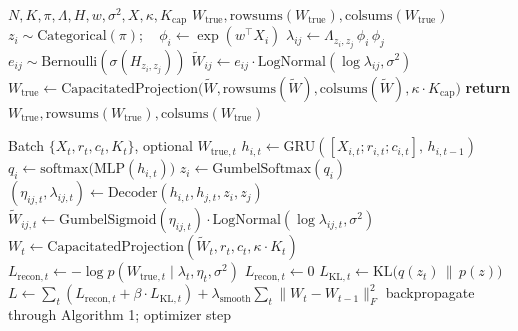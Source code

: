 \documentclass[
  a4paper,
]{article}
\begin{document}
\begin{algorithm}[htbp]
\caption{Sample Synthetic Network}
  \begin{algorithmic}[1]
  \Require $N, K, \pi, \Lambda, H, w, \sigma^2, X, \kappa, K_{\text{cap}}$
  \Ensure $W_{\text{true}}, \text{rowsums}(W_{\text{true}}), \text{colsums}(W_{\text{true}})$
      \State $z_i \sim \text{Categorical}(\pi); \quad \phi_i \leftarrow \exp(w^\top X_i)$
  \EndFor
      \State $\lambda_{ij} \leftarrow \Lambda_{z_i, z_j} \, \phi_i \, \phi_j$
      \State $e_{ij} \sim \text{Bernoulli}(\sigma(H_{z_i, z_j}))$
      \State $\tilde{W}_{ij} \leftarrow e_{ij} \cdot \text{LogNormal}(\log \lambda_{ij}, \sigma^2)$
  \EndFor
  \State $W_{\text{true}} \leftarrow \text{CapacitatedProjection}\big(\tilde{W}, \text{rowsums}(\tilde{W}), \text{colsums}(\tilde{W}), \kappa \cdot K_{\text{cap}}\big)$
  \State \textbf{return} $W_{\text{true}}, \text{rowsums}(W_{\text{true}}), \text{colsums}(W_{\text{true}})$
  \end{algorithmic}
\end{algorithm}
\begin{algorithm}[htbp]
\caption{Training Step}
  \begin{algorithmic}[1]
  \Require Batch $\{X_t, r_t, c_t, K_t\}$, optional $W_{\text{true}, t}$
      \State $h_{i,t} \leftarrow \text{GRU}\left([X_{i,t}; r_{i,t}; c_{i,t}], \, h_{i,t-1}\right)$
      \State $q_i \leftarrow \text{softmax}\big(\text{MLP}(h_{i,t})\big)$
      \State $z_i \leftarrow \text{GumbelSoftmax}(q_i)$
      \State $(\eta_{ij,t}, \lambda_{ij,t}) \leftarrow \text{Decoder}(h_{i,t}, h_{j,t}, z_i, z_j)$
      \State $\tilde{W}_{ij,t} \leftarrow \text{GumbelSigmoid}(\eta_{ij,t}) \cdot \text{LogNormal}(\log \lambda_{ij,t}, \sigma^2)$
      \State $W_t \leftarrow \text{CapacitatedProjection}(\tilde{W}_t, r_t, c_t, \kappa \cdot K_t)$
          \State $L_{\text{recon}, t} \leftarrow -\log p(W_{\text{true}, t} \mid \lambda_t, \eta_t, \sigma^2)$
      \Else
          \State $L_{\text{recon}, t} \leftarrow 0$
      \EndIf
      \State $L_{\text{KL}, t} \leftarrow \text{KL}\big(q(z_t) \,\|\, p(z)\big)$
  \EndFor
  \State $L \leftarrow \sum_t \left(L_{\text{recon}, t} + \beta \cdot L_{\text{KL}, t}\right) + \lambda_{\text{smooth}} \sum_t \|W_t - W_{t-1}\|_F^2$
  \State backpropagate through Algorithm 1; optimizer step
  \end{algorithmic}
\end{algorithm}
\end{document}
